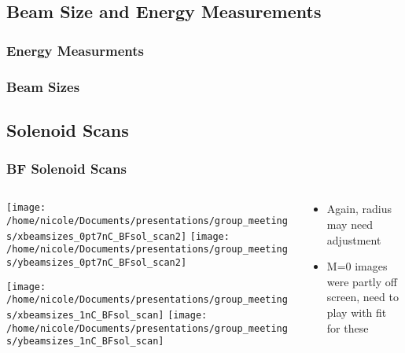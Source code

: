 \documentclass[professionalfonts,t]{beamer}
\begin{document}
\subsection{Beam Size and Energy Measurements}
\begin{frame}
	\frametitle{Energy Measurments}
\end{frame}

\begin{frame}
	\frametitle{Beam Sizes}
\end{frame}


\subsection{Solenoid Scans}
\begin{frame}
\frametitle{BF Solenoid Scans}
\begin{columns}[T]
\begin{column}{0.76\textwidth}
	\begin{minipage}{0.5\textheight}
		\texttt{[image: /home/nicole/Documents/presentations/group\_meetings/xbeamsizes\_0pt7nC\_BFsol\_scan2]}
		\texttt{[image: /home/nicole/Documents/presentations/group\_meetings/ybeamsizes\_0pt7nC\_BFsol\_scan2]}%
	\end{minipage}
	\begin{minipage}{0.5\textheight}
		\texttt{[image: /home/nicole/Documents/presentations/group\_meetings/xbeamsizes\_1nC\_BFsol\_scan]}
		\texttt{[image: /home/nicole/Documents/presentations/group\_meetings/ybeamsizes\_1nC\_BFsol\_scan]}
	\end{minipage}
\end{column}
\begin{column}{0.4\textwidth}
	\begin{itemize}
		\item Again, radius may need adjustment
		\item M=0 images were partly off screen, need to play with fit for these
	\end{itemize}
\end{column}
\end{columns}
\end{frame}
\end{document}
